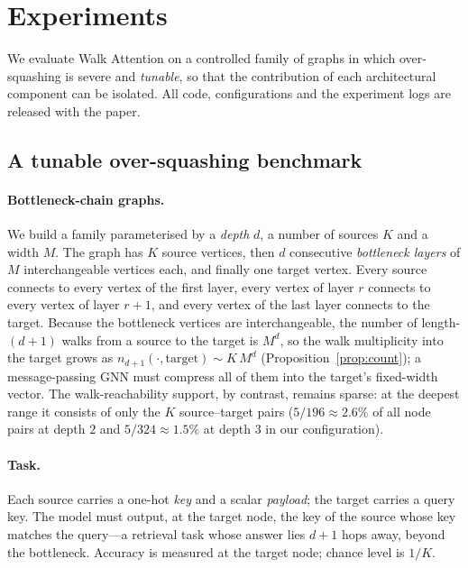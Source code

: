 \section{Experiments}\label{sec:exp}

We evaluate Walk Attention on a controlled family of graphs in which
over-squashing is severe and \emph{tunable}, so that the contribution of each
architectural component can be isolated. All code, configurations and the
experiment logs are released with the paper.

\subsection{A tunable over-squashing benchmark}

\paragraph{Bottleneck-chain graphs.}
We build a family parameterised by a \emph{depth} $d$, a number of sources $K$
and a width $M$. The graph has $K$ source vertices, then $d$ consecutive
\emph{bottleneck layers} of $M$ interchangeable vertices each, and finally one
target vertex. Every source connects to every vertex of the first layer, every
vertex of layer $r$ connects to every vertex of layer $r+1$, and every vertex of
the last layer connects to the target. Because the bottleneck vertices are
interchangeable, the number of length-$(d{+}1)$ walks from a source to the target
is $M^{d}$, so the walk multiplicity into the target grows as
$n_{d+1}(\cdot,\text{target})\sim K\,M^{d}$
(Proposition~\ref{prop:count}); a message-passing GNN must compress all of them
into the target's fixed-width vector. The walk-reachability support, by contrast,
remains sparse: at the deepest range it consists of only the $K$ source--target
pairs ($5/196\approx2.6\%$ of all node pairs at depth $2$ and
$5/324\approx1.5\%$ at depth $3$ in our configuration).

\paragraph{Task.}
Each source carries a one-hot \emph{key} and a scalar \emph{payload}; the target
carries a query key. The model must output, at the target node, the key of the
source whose key matches the query---a retrieval task whose answer lies $d{+}1$
hops away, beyond the bottleneck. Accuracy is measured at the target node;
chance level is $1/K$.

